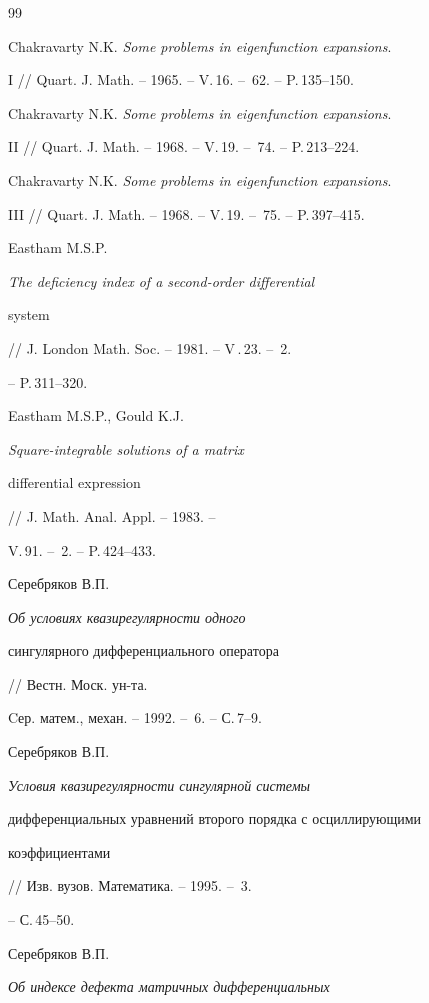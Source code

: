 \begin{thebibliography}{99} 


 




Chakravarty N.K. {\em Some problems in eigenfunction expansions}. 


I // Quart. J. Math. -- 1965. -- V.\,16. -- \No\,62. -- P.\,135--150. 




Chakravarty N.K. {\em Some problems in eigenfunction expansions}. 


II // Quart. J. Math. -- 1968. -- V.\,19. -- \No\,74. -- P.\,213--224. 




Chakravarty N.K. {\em Some problems in eigenfunction expansions}. 


III // Quart. J. Math. -- 1968. -- V.\,19. -- \No\,75. -- P.\,397--415. 




Eastham M.S.P. {\em The deficiency index of a second-order differential 


system} // J. London Math. Soc. -- 1981. -- V\,.\,23. -- \No\,2. 


-- P.\,311--320. 




Eastham M.S.P., Gould K.J. {\em Square-integrable solutions of a matrix 


differential expression} // J. Math. Anal. Appl. -- 1983. -- 


V.\,91. -- \No\,2. -- P.\,424--433. 




Серебряков В.П. {\em Об условиях квазирегулярности одного 


сингулярного дифференциального оператора} // Вестн. Моск. ун-та. 


Cер. матем., механ. -- 1992. -- \No\,6. -- С.\,7--9. 




Серебряков В.П. {\em Условия квазирегулярности сингулярной системы 


дифференциальных уравнений второго порядка с осциллирующими 


коэффициентами} // Изв. вузов. Математика. -- 1995. -- \No\,3. 


-- С.\,45--50. 




Серебряков В.П. {\em Об индексе дефекта матричных дифференциальных 


}
\end{thebibliography}
